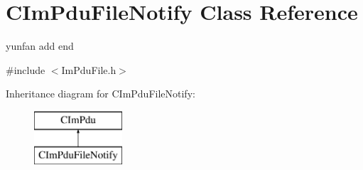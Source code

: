 \hypertarget{class_c_im_pdu_file_notify}{}\section{C\+Im\+Pdu\+File\+Notify Class Reference}
\label{class_c_im_pdu_file_notify}


yunfan add end  




{\ttfamily \#include $<$Im\+Pdu\+File.\+h$>$}

Inheritance diagram for C\+Im\+Pdu\+File\+Notify\+:\begin{figure}[H]
\begin{center}
\leavevmode
\includegraphics[height=2.000000cm]{class_c_im_pdu_file_notify}
\end{center}
\end{figure}
